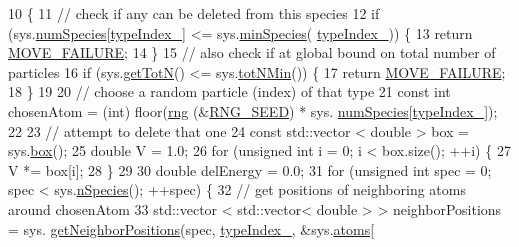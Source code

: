 \begin{DoxyCode}
10                                         \{
11                 \textcolor{comment}{// check if any can be deleted from this species}
12     \textcolor{keywordflow}{if} (sys.\hyperlink{classsim_system_a9eea865e6dc1cff377b1e79c4d9c23f0}{numSpecies}[\hyperlink{classmc_move_acb731965547b0326ef318ec96da8b46a}{typeIndex\_}] <= sys.\hyperlink{classsim_system_afafda4a09ed180ee9c5580d196d8ca9f}{minSpecies}(
      \hyperlink{classmc_move_acb731965547b0326ef318ec96da8b46a}{typeIndex\_})) \{
13         \textcolor{keywordflow}{return} \hyperlink{moves_8h_a9832cf5fcfa8c0894545b591c9908e39}{MOVE\_FAILURE};
14     \}
15     \textcolor{comment}{// also check if at global bound on total number of particles}
16     \textcolor{keywordflow}{if} (sys.\hyperlink{classsim_system_a37dd827f4057049763351510147b9f1d}{getTotN}() <= sys.\hyperlink{classsim_system_af10842e0eaa638373b8717c87b47e6bc}{totNMin}()) \{
17                 \textcolor{keywordflow}{return} \hyperlink{moves_8h_a9832cf5fcfa8c0894545b591c9908e39}{MOVE\_FAILURE};
18     \}
19     
20                 \textcolor{comment}{// choose a random particle (index) of that type}
21                 \textcolor{keyword}{const} \textcolor{keywordtype}{int} chosenAtom = (int) floor(\hyperlink{utilities_8cpp_a0f9542af4b475ac79cb679d7a8d14db0}{rng} (&\hyperlink{global_8h_a3f4e4ea24d5a5c66feae55d1f329c884}{RNG\_SEED}) * sys.
      \hyperlink{classsim_system_a9eea865e6dc1cff377b1e79c4d9c23f0}{numSpecies}[\hyperlink{classmc_move_acb731965547b0326ef318ec96da8b46a}{typeIndex\_}]);
22 
23                 \textcolor{comment}{// attempt to delete that one}
24                 \textcolor{keyword}{const} std::vector < double > box = sys.\hyperlink{classsim_system_a8bff9dfb95b1b09a0fab2c1c485ade07}{box}();
25     \textcolor{keywordtype}{double} V = 1.0;
26     \textcolor{keywordflow}{for} (\textcolor{keywordtype}{unsigned} \textcolor{keywordtype}{int} i = 0; i < box.size(); ++i) \{
27         V *= box[i];
28     \}
29         
30     \textcolor{keywordtype}{double} delEnergy = 0.0;
31     \textcolor{keywordflow}{for} (\textcolor{keywordtype}{unsigned} \textcolor{keywordtype}{int} spec = 0; spec < sys.\hyperlink{classsim_system_ab5e2e9b6204de15520302fe1d51688dd}{nSpecies}(); ++spec) \{
32         \textcolor{comment}{// get positions of neighboring atoms around chosenAtom}
33         std::vector < std::vector< double > > neighborPositions = sys.
      \hyperlink{classsim_system_a7ac49b2311cd8230df8d078a9d897b35}{getNeighborPositions}(spec, \hyperlink{classmc_move_acb731965547b0326ef318ec96da8b46a}{typeIndex\_}, &sys.\hyperlink{classsim_system_a90421b19082f7fb8fc23b7264b1161e4}{atoms}[

\end{DoxyCode}
